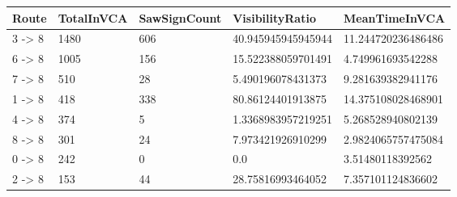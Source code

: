 \begin{tabular}{lllll}
\hline
Route & TotalInVCA & SawSignCount & VisibilityRatio & MeanTimeInVCA \\ \hline
3 -> 8 & 1480 & 606 & 40.945945945945944 & 11.244720236486486 \\
6 -> 8 & 1005 & 156 & 15.522388059701491 & 4.749961693542288 \\
7 -> 8 & 510 & 28 & 5.490196078431373 & 9.281639382941176 \\
1 -> 8 & 418 & 338 & 80.86124401913875 & 14.375108028468901 \\
4 -> 8 & 374 & 5 & 1.3368983957219251 & 5.268528940802139 \\
8 -> 8 & 301 & 24 & 7.973421926910299 & 2.9824065757475084 \\
0 -> 8 & 242 & 0 & 0.0 & 3.51480118392562 \\
2 -> 8 & 153 & 44 & 28.75816993464052 & 7.357101124836602 \\
\hline
\end{tabular}
